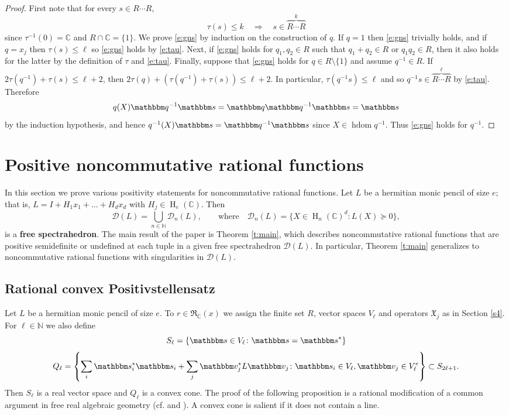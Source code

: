 \documentclass[12pt,a4paper]{amsart}
\DeclareMathOperator{\hdom}{hdom}
\DeclareMathOperator{\oph}{H}
\newcommand{\N}{\mathbb{N}}
\newcommand{\C}{\mathbb{C}}
\newcommand{\cD}{\mathcal{D}}
\newcommand{\rs}{\mathbbm s}
\newcommand{\qq}{\mathbbm q}
\newcommand{\rv}{\mathbbm v}
\newcommand{\fX}{\mathfrak{X}}
\newcommand*{\her}[1]{\oph_{#1}(\C)}
\newcommand{\hV}{S}
\newcommand{\rex}{\mathfrak{R}_{\C}(x)}
\theoremstyle{definition}
\theoremstyle{remark}
\numberwithin{equation}{section}
\begin{document}
\begin{proof}
First note that for every $s\in R\cdots R$,
\begin{equation}\label{e:tau}
\tau(s)\le k\quad \Rightarrow \quad s\in \overbrace{R\cdots R}^k
\end{equation}
since $\tau^{-1}(0)=\C$ and $R\cap\C=\{1\}$. We prove \eqref{e:gns} by induction on the construction of $q$.
If $q=1$ then \eqref{e:gns} trivially holds, and if $q=x_j$ then $\tau(s)\le \ell$ so \eqref{e:gns} holds by \eqref{e:tau}. 
Next, if \eqref{e:gns} holds for $q_1,q_2\in R$ such that $q_1+q_2\in R$ or $q_1q_2\in R$, then it also holds for the latter by the definition of $\tau$ and \eqref{e:tau}. 
Finally, suppose that \eqref{e:gns} holds for $q\in R\setminus\{1\}$ and assume $q^{-1}\in R$. If $2\tau(q^{-1})+\tau(s)\le \ell+2$, then $2\tau(q)+(\tau(q^{-1})+\tau(s))\le \ell+2$.
In particular, $\tau(q^{-1}s)\le \ell$ and so $q^{-1}s\in \overbrace{R\cdots R}^\ell$ by \eqref{e:tau}. Therefore
$$q(X)\qq^{-1}\rs = \qq\qq^{-1}\rs=\rs$$
by the induction hypothesis, and hence $q^{-1}(X)\rs =\qq^{-1}\rs$ since $X\in\hdom q^{-1}$. Thus \eqref{e:gns} holds for $q^{-1}$. 
\end{proof}

\section{Positive noncommutative rational functions}\label{s5}

In this section we prove various positivity statements for noncommutative rational functions. Let $L$ be a hermitian monic pencil of size $e$; that is, $L=I+H_1x_1+\dots+H_dx_d$ with $H_j\in\her{e}$. Then
$$\cD(L) = \bigcup_{n\in\N}\cD_n(L),
\qquad \text{where}\quad\cD_n(L)=\{X\in\her{n}^d\colon L(X)\succeq0 \},$$
is a {\bf free spectrahedron}. The main result of the paper is Theorem \ref{t:main}, which describes noncommutative rational functions that are positive semidefinite or undefined at each tuple in a given free spectrahedron $\cD(L)$. In particular, Theorem \ref{t:main} generalizes \cite[Theorem 3.1]{Pas} to noncommutative rational functions with singularities in $\cD(L)$.

\subsection{Rational convex Positivstellensatz}

Let $L$ be a hermitian monic pencil of size $e$. To $r\in\rex$ we assign the finite set $R$, vector spaces $V_\ell$ and operators $\fX_j$ as in Section \ref{s4}. For $\ell\in\N$ we also define
$$\hV_\ell = \{\rs\in V_\ell\colon \rs=\rs^* \}$$
$$Q_\ell = \left\{
\sum_i \rs_i^*\rs_i+\sum_j \rv_j^* L\rv_j\colon \rs_i \in V_\ell, \rv_j\in V_\ell^e
\right\}\subset \hV_{2\ell+1}.$$
Then $\hV_\ell$ is a real vector space and $Q_\ell$ is a convex cone. The proof of the following proposition is a rational modification of a common argument in free real algebraic geometry (cf. \cite[Proposition 3.1]{HKM} and \cite[Proposition 4.1]{KPV}). A convex cone is salient if it does not contain a line.
\end{document}
